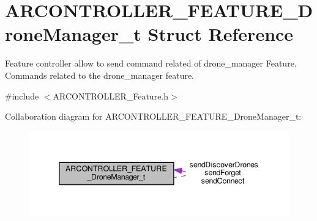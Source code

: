 \hypertarget{struct_a_r_c_o_n_t_r_o_l_l_e_r___f_e_a_t_u_r_e___drone_manager__t}{}\section{A\+R\+C\+O\+N\+T\+R\+O\+L\+L\+E\+R\+\_\+\+F\+E\+A\+T\+U\+R\+E\+\_\+\+Drone\+Manager\+\_\+t Struct Reference}
\label{struct_a_r_c_o_n_t_r_o_l_l_e_r___f_e_a_t_u_r_e___drone_manager__t}


Feature controller allow to send command related of drone\+\_\+manager Feature. Commands related to the drone\+\_\+manager feature.  




{\ttfamily \#include $<$A\+R\+C\+O\+N\+T\+R\+O\+L\+L\+E\+R\+\_\+\+Feature.\+h$>$}



Collaboration diagram for A\+R\+C\+O\+N\+T\+R\+O\+L\+L\+E\+R\+\_\+\+F\+E\+A\+T\+U\+R\+E\+\_\+\+Drone\+Manager\+\_\+t\+:
\nopagebreak
\begin{figure}[H]
\begin{center}
\leavevmode
\includegraphics[width=345pt]{struct_a_r_c_o_n_t_r_o_l_l_e_r___f_e_a_t_u_r_e___drone_manager__t__coll__graph}
\end{center}
\end{figure}
